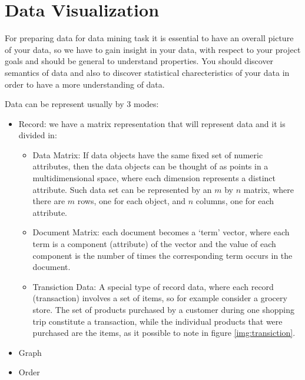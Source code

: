 \chapter{Data Visualization}
For preparing data for data mining task it is essential to have an overall picture of your data, so we have to
gain insight in your data, with respect to your project goals and should be general to understand properties.\newline
You should discover semantics of data and also to discover statistical charecteristics of your data in
order to have a more understanding of data.

Data can be represent usually by $3$ modes:
\begin{itemize}
    \item Record: we have a matrix representation that will represent data and it is divided in:
            \begin{itemize}
                \item Data Matrix: If data objects have the same fixed set of numeric attributes,
                      then the data objects can be thought of as points in a multidimensional space,
                      where each dimension represents a distinct attribute.\newline
                      Such data set can be represented by an $m$ by $n$ matrix, where there are $m$ rows,
                      one for each object, and $n$ columns, one for each attribute.

                \item Document Matrix: each document becomes a ‘term’ vector, where each term 
                      is a component (attribute) of the vector and the value of each component is 
                      the number of times the corresponding term occurs in the document.
                \item Transiction Data: A special type of record data, where each record (transaction)
                      involves a set of items, so for example consider a grocery store.\newline
                      The set of products purchased by a customer during one shopping trip constitute a transaction,
                      while the individual products that were purchased are the items,
                      as it possible to note in figure \ref{img:transiction}.
            \end{itemize}
    \item Graph
    \item Order
\end{itemize}

